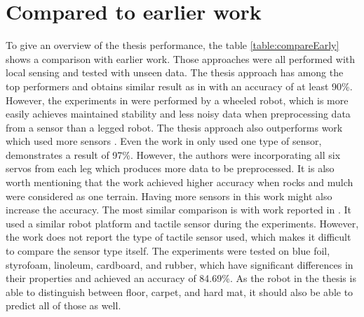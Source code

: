 \documentclass[USenglish]{ifimaster}  %
\begin{document}
\section{Compared to earlier work}
To give an overview of the thesis performance, the table \ref{table:compareEarly} shows a comparison with earlier work. Those approaches were all performed with local sensing and tested with unseen data. The thesis approach has among the top performers and obtains similar result as in \cite{5752869,4059113,5602459,26b23e912c654fe4b7478fd910130195} with an accuracy of at least 90\%. However, the experiments in \cite{5752869,4059113} were performed by a wheeled robot, which is more easily achieves maintained stability and less noisy data when preprocessing data from a sensor than a legged robot. The thesis approach also outperforms work which used more sensors \cite{6386243}. Even the work in \cite{26b23e912c654fe4b7478fd910130195} only used one type of sensor, demonstrates a result of 97\%.  However, the authors were incorporating all six servos from each leg which produces more data to be preprocessed. It is also worth mentioning that the work achieved higher accuracy when rocks and mulch were considered as one terrain. Having more sensors in this work might also increase the accuracy. The most similar comparison is with work reported in \cite{6784609}. It used a similar robot platform and tactile sensor during the experiments. However, the work does not report the type of tactile sensor used, which makes it difficult to compare the sensor type itself. The experiments were tested on blue foil, styrofoam, linoleum, cardboard, and rubber, which have significant differences in their properties and achieved an accuracy of 84.69\%. As the robot in the thesis is able to distinguish between floor, carpet, and hard mat, it should also be able to predict all of those as well.
\end{document}

